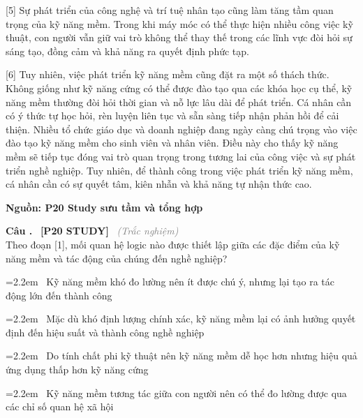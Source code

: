 \documentclass[12pt,a4paper,twoside]{article}
\newcounter{qcounter}
\newcommand{\question}[2][]{%
    \stepcounter{qcounter}%
    \par\vspace{5pt}%
    \noindent\textcolor{primaryBlue}{\textbf{Câu \theqcounter.}}~%
    \textcolor{secondaryBlue}{\small\textbf{[P20 STUDY]}}~%
    \if\relax\detokenize{#1}\relax\else\textcolor{gray}{\small\textit{(#1)}}~\fi\\[1pt]
    \noindent #2%
}
\newcommand{\choiceitem}[2]{%
    \tikz[baseline=-0.5ex]{
        \node[draw=primaryBlue, circle, minimum size=1.5em, inner sep=0pt, thick] {\textbf{#1}};
    }~#2%
}
\newenvironment{readingpassage}[1][]{%
    \begin{tcolorbox}[enhanced, colback=grayLight, colframe=secondaryBlue,
        coltitle=textDark, fonttitle=\bfseries, title={#1},
        rounded corners, arc=3mm, boxrule=1pt,
        left=15pt, right=15pt, top=10pt, bottom=10pt,
        breakable, before skip=10pt, after skip=10pt, drop fuzzy shadow]
    \setstretch{1.3}
}{\end{tcolorbox}}
\begin{document}
\begin{readingpassage}[]
[5] Sự phát triển của công nghệ và trí tuệ nhân tạo cũng làm tăng tầm quan trọng của kỹ năng mềm. Trong khi máy móc có thể thực hiện nhiều công việc kỹ thuật, con người vẫn giữ vai trò không thể thay thế trong các lĩnh vực đòi hỏi sự sáng tạo, đồng cảm và khả năng ra quyết định phức tạp.

[6] Tuy nhiên, việc phát triển kỹ năng mềm cũng đặt ra một số thách thức. Không giống như kỹ năng cứng có thể được đào tạo qua các khóa học cụ thể, kỹ năng mềm thường đòi hỏi thời gian và nỗ lực lâu dài để phát triển. Cá nhân cần có ý thức tự học hỏi, rèn luyện liên tục và sẵn sàng tiếp nhận phản hồi để cải thiện. Nhiều tổ chức giáo dục và doanh nghiệp đang ngày càng chú trọng vào việc đào tạo kỹ năng mềm cho sinh viên và nhân viên. Điều này cho thấy kỹ năng mềm sẽ tiếp tục đóng vai trò quan trọng trong tương lai của công việc và sự phát triển nghề nghiệp. Tuy nhiên, để thành công trong việc phát triển kỹ năng mềm, cá nhân cần có sự quyết tâm, kiên nhẫn và khả năng tự nhận thức cao.

\hfill \textbf{Nguồn: P20 Study sưu tầm và tổng hợp}
\end{readingpassage}

\setcounter{qcounter}{0}
\question[Trắc nghiệm]{Theo đoạn [1], mối quan hệ logic nào được thiết lập giữa các đặc điểm của kỹ năng mềm và tác động của chúng đến nghề nghiệp?}
\par\vspace{4pt}
\noindent\hangindent=2.2em\choiceitem{A}{Kỹ năng mềm khó đo lường nên ít được chú ý, nhưng lại tạo ra tác động lớn đến thành công}\par\vspace{4pt}
\noindent\hangindent=2.2em\choiceitem{B}{Mặc dù khó định lượng chính xác, kỹ năng mềm lại có ảnh hưởng quyết định đến hiệu suất và thành công nghề nghiệp}\par\vspace{4pt}
\noindent\hangindent=2.2em\choiceitem{C}{Do tính chất phi kỹ thuật nên kỹ năng mềm dễ học hơn nhưng hiệu quả ứng dụng thấp hơn kỹ năng cứng}\par\vspace{4pt}
\noindent\hangindent=2.2em\choiceitem{D}{Kỹ năng mềm tương tác giữa con người nên có thể đo lường được qua các chỉ số quan hệ xã hội}\par\vspace{4pt}
\end{document}
